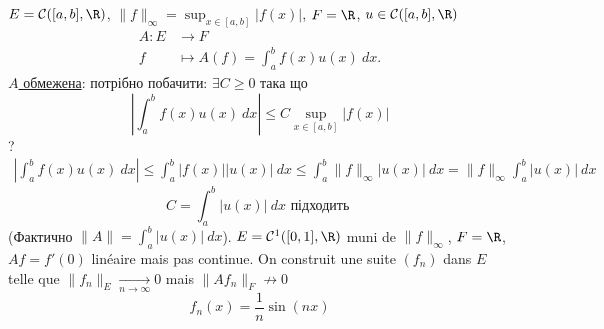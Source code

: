 \begin{eg}
    $E = \mathcal{C}([a, b], \R)$, $\|f\|_{\infty} = \sup_{x \in [a, b]} |f(x)|$, $F = \R$, $u \in \mathcal{C}([a, b], \R)$
    \begin{align*}
        A: E &\longrightarrow F \\
        f &\longmapsto A(f) = \int_{{a}}^{{b}} {f(x)u(x)} \: d{x} {}
    .\end{align*}
    \underline{$A$ обмежена}: потрібно побачити: $\exists C \ge 0$ така що  
    \[
        \left| \int_{{a}}^{{b}} {f(x)u(x)} \: d{x} {} \right| \le C \sup_{x \in [a, b]} |f(x)|
    \] 
    ?
    \begin{align*}
        \left| \int_{{a}}^{{b}} {f(x)u(x)} \: d{x} {} \right| \le \int_{{a}}^{{b}} {|f(x)| |u(x)|} \: d{x} {} \le \int_{{a}}^{{b}} {\|f\|_{\infty}|u(x)|} \: d{x} {= \|f\|_{\infty} \int_{{a}}^{{b}} {|u(x)|} \: d{x} {}}
    \end{align*}
    \[
    C = \int_{{a}}^{{b}} {|u(x)|} \: d{x} \text{ підходить }
    \] 
    (Фактично $\|A\| = \int_{{a}}^{{b}} {|u(x)|} \: d{x} {}$). $E = \mathcal{C}^1([0,1], \R)$ muni de $\|f\|_{\infty}$, $F = \R$, $Af = f'(0)$ linéaire mais pas continue. On construit une suite  $(f_n)$ dans  $E$ telle que  $\|f_n\|_E \xrightarrow[n \to  \infty]{} 0$ mais $\|Af_n\|_F \not\to 0$
    \[
    f_n(x) = \frac{1}{n}\sin(nx)
    \] 
\end{eg}

